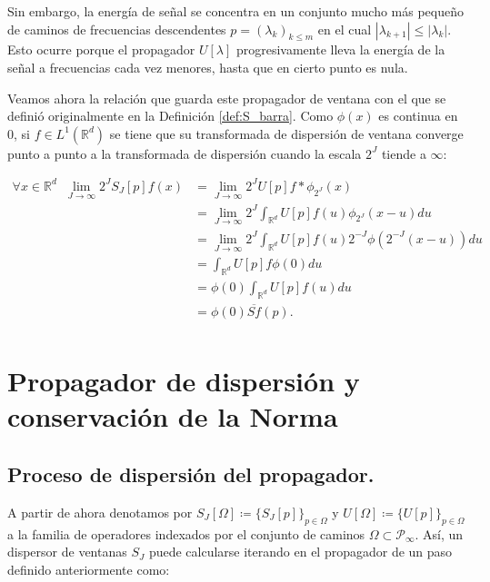 \medskip

\noindent Sin embargo, la energía de señal se concentra en un conjunto mucho más pequeño de caminos de frecuencias descendentes $p=(\lambda_k)_{k\leq m}$ en el cual $|\lambda_{k+1}| \leq |\lambda_k|$. Esto ocurre porque el propagador $U[\lambda]$ progresivamente lleva la energía de la señal a frecuencias cada vez menores, hasta que en cierto punto es nula.

\medskip

\noindent Veamos ahora la relación que guarda este propagador de ventana con el que se definió originalmente en la Definición \ref{def:S_barra}. Como $\phi(x)$ es continua en $0$, si $f\in L^1 (\mathbb{R}^d)$ se tiene que su transformada de dispersión de ventana converge punto a punto a la transformada de dispersión cuando la escala $2^J$ tiende a $\infty$: 

\begin{align*}
    \forall x \in \mathbb{R}^d \;\; \lim_{J \rightarrow \infty} 2^{J} S_J[p]f(x) 
    &=\lim_{J \rightarrow \infty} 2^{J} U[p]f \ast \phi_{2^J}(x) \\
    &=\lim_{J \rightarrow \infty} 2^{J} \int_{\mathbb{R}^d} U[p]f(u)\phi_{2^J}(x-u) du \\
    &=\lim_{J \rightarrow \infty} 2^{J} \int_{\mathbb{R}^d} U[p]f(u) 2^{-J} \phi(2^{-J}(x-u)) du   \\
    &= \int_{\mathbb{R}^d} U[p]f \phi(0) du  \\
    &=\phi(0)\int_{\mathbb{R}^d}U[p]f(u) du \\
    &= \phi(0)\overline{Sf}(p).\\ 
\end{align*}

\section{Propagador de dispersión y conservación de la Norma} \label{ch:seccion13}


\subsection{Proceso de dispersión del propagador.}

\noindent A partir de ahora denotamos por $S_J[\Omega] \coloneqq \lbrace S_J[p] \rbrace_{p\in\Omega}$ y $U[\Omega]\coloneqq \lbrace U[p] \rbrace_{p\in\Omega}$ a la familia de operadores indexados por el conjunto de caminos $\Omega \subset \mathcal{P}_\infty$. Así, un dispersor de ventanas $S_J$ puede calcularse iterando en el propagador de un paso definido anteriormente como: 

